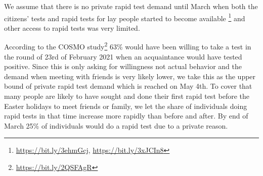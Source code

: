 We assume that there is no private rapid test demand until March when both the citizens'
tests and rapid tests for lay people started to become available
\footnote{\url{https://bit.ly/3ehmGcj}, \url{https://bit.ly/3xJCIn8}} and other access to
rapid tests was very limited.

According to the COSMO study\footnote{\url{https://bit.ly/2QSFAgR}} 63\% would have been
willing to take a test in the round of 23rd of February 2021 when an acquaintance would
have tested positive. Since this is only asking for willingness not actual behavior and
the demand when meeting with friends is very likely lower, we take this as the upper
bound of private rapid test demand which is reached on May 4th. To cover that many people
are likely to have sought and done their first rapid test before the Easter holidays to
meet friends or family, we let the share of individuals doing rapid tests in that time
increase more rapidly than before and after. By end of March 25\% of individuals would do
a rapid test due to a private reason.

